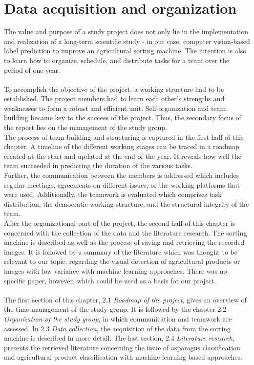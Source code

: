
\section{Data acquisition and organization}

The value and purpose of a study project does not only lie in the implementation and realization of a long-term scientific study - in our case, computer vision-based label prediction to improve an agricultural sorting machine. The intention is also to learn how to organize, schedule, and distribute tasks for a team over the period of one year. \\
 \\
To accomplish the objective of the project, a working structure had to be established. The project members had to learn each other's strengths and weaknesses to form a robust and efficient unit. Self-organization and team building became key to the success of the project. Thus, the secondary focus of the report lies on the management of the study group. \\
The process of team building and structuring is captured in the first half of this chapter. A timeline of the different working stages can be traced in a roadmap created at the start and updated at the end of the year. It reveals how well the team succeeded in predicting the duration of the various tasks. \\
Further, the communication between the members is addressed which includes regular meetings, agreements on different issues, or the working platforms that were used. Additionally, the teamwork is evaluated which comprises task distribution, the democratic working structure, and the structural integrity of the team. \\
After the organizational part of the project, the second half of this chapter is concerned with the collection of the data and the literature research. The sorting machine is described as well as the process of saving and retrieving the recorded images. It is followed by a summary of the literature which was thought to be relevant to our topic, regarding the visual detection of agricultural products or images with low variance with machine learning approaches. There was no specific paper, however, which could be used as a basis for our project. \\
\\
The first section of this chapter, 2.1 \textit{Roadmap of the project}, gives an overview of the time management of the study group. It is followed by the chapter 2.2 \textit{Organization of the study group}, in which communication and teamwork are assessed. In 2.3 \textit{Data collection}, the acquisition of the data from the sorting machine is described in more detail. The last section, 2.4 \textit{Literature research}, presents the retrieved literature concerning the issue of asparagus classification and agricultural product classification with machine learning based approaches.



